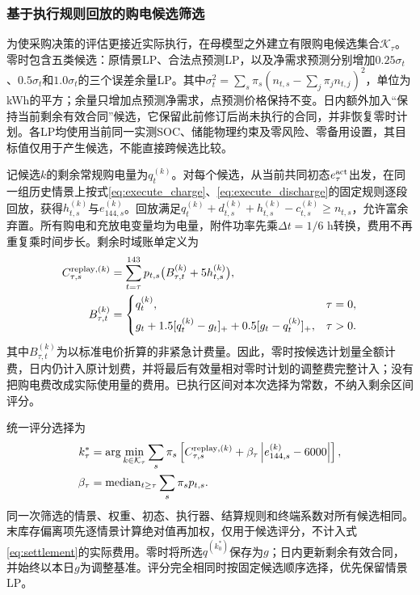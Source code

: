 \subsubsection{基于执行规则回放的购电候选筛选}
\label{sec:q3_candidate_screening}

为使采购决策的评估更接近实际执行，在母模型之外建立有限购电候选集合$\mathcal K_\tau$。零时包含五类候选：原情景LP、合法点预测LP，以及净需求预测分别增加$0.25\sigma_t$、$0.5\sigma_t$和$1.0\sigma_t$的三个误差余量LP。其中$\sigma_t^2=\sum_s\pi_s(n_{t,s}-\sum_j\pi_jn_{t,j})^2$，单位为kWh的平方；余量只增加点预测净需求，点预测价格保持不变。日内额外加入“保持当前剩余有效合同”候选，它保留此前修订后尚未执行的合同，并非恢复零时计划。各LP均使用当前同一实测SOC、储能物理约束及零风险、零备用设置，其目标值仅用于产生候选，不能直接跨候选比较。

记候选$k$的剩余常规购电量为$q_t^{(k)}$。对每个候选，从当前共同初态$e_\tau^{\rm act}$出发，在同一组历史情景上按式\eqref{eq:execute_charge}、\eqref{eq:execute_discharge}的固定规则逐段回放，获得$h_{t,s}^{(k)}$与$e_{144,s}^{(k)}$。回放满足$q_t^{(k)}+d_{t,s}^{(k)}+h_{t,s}^{(k)}-c_{t,s}^{(k)}\ge n_{t,s}$，允许富余弃置。所有购电和充放电变量均为电量，附件功率先乘$\Delta t=1/6$ h转换，费用不再重复乘时间步长。剩余时域账单定义为
\begin{align}
 C_{\tau,s}^{\mathrm{replay},(k)}
 &=\sum_{t=\tau}^{143}p_{t,s}\bigl(B_{\tau,t}^{(k)}+5h_{t,s}^{(k)}\bigr),
 \label{eq:q3_replay_bill}\\
 B_{\tau,t}^{(k)}&=
 \begin{cases}
 q_t^{(k)},&\tau=0,\\[1ex]
 g_t+1.5[q_t^{(k)}-g_t]_++0.5[g_t-q_t^{(k)}]_+,&\tau>0.
 \end{cases}\notag
\end{align}
其中$B_{\tau,t}^{(k)}$为以标准电价折算的非紧急计费量。因此，零时按候选计划量全额计费，日内仍计入原计划费，并将最后有效量相对零时计划的调整费完整计入；没有把购电费改成实际使用量的费用。已执行区间对本次选择为常数，不纳入剩余区间评分。

统一评分选择为
\begin{align}
 k_\tau^*&=\arg\min_{k\in\mathcal K_\tau}\sum_s\pi_s
 \left[C_{\tau,s}^{\mathrm{replay},(k)}
 +\beta_\tau\left|e_{144,s}^{(k)}-6000\right|\right],
 \label{eq:q3_candidate_score}\\
 \beta_\tau&=\operatorname{median}_{t\ge\tau}\sum_s\pi_sp_{t,s}.\notag
\end{align}
同一次筛选的情景、权重、初态、执行器、结算规则和终端系数对所有候选相同。末库存偏离项先逐情景计算绝对值再加权，仅用于候选评分，不计入式\eqref{eq:settlement}的实际费用。零时将所选$q^{(k_0^*)}$保存为$g$；日内更新剩余有效合同，并始终以本日$g$为调整基准。评分完全相同时按固定候选顺序选择，优先保留情景LP。

